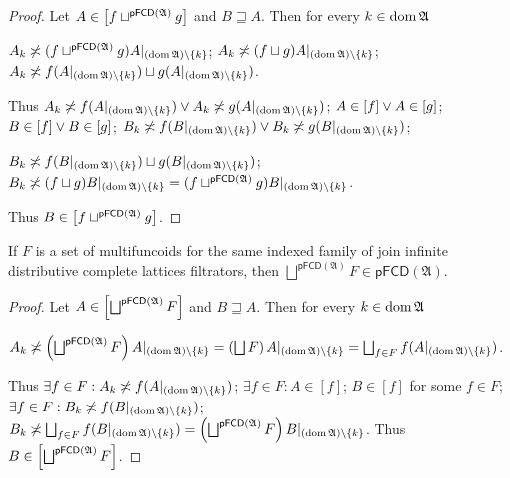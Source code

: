 \begin{proof}
Let $A\in\mathord{\mathrel{\left[f\sqcup^{\mathsf{pFCD}(\mathfrak{A})}g\right]}}$
and $B\sqsupseteq A$. Then for every $k\in\operatorname{dom}\mathfrak{A}$

$A_{k}\not\asymp(f\sqcup^{\mathsf{pFCD}(\mathfrak{A})}g)A|_{(\operatorname{dom}\mathfrak{A})\setminus\{k\}}$;
$A_{k}\not\asymp(f\sqcup g)A|_{(\operatorname{dom}\mathfrak{A})\setminus\{k\}}$; $A_{k}\not\asymp f(A|_{(\operatorname{dom}\mathfrak{A})\setminus\{k\}})\sqcup g(A|_{(\operatorname{dom}\mathfrak{A})\setminus\{k\}})$.

Thus $A_{k}\not\asymp f(A|_{(\operatorname{dom}\mathfrak{A})\setminus\{k\}})\lor A_{k}\not\asymp g(A|_{(\operatorname{dom}\mathfrak{A})\setminus\{k\}})$;
$A\in\mathord{\mathrel{\left[f\right]}}\lor A\in\mathord{\mathrel{\left[g\right]}}$; $B\in\mathord{\mathrel{\left[f\right]}}\lor B\in\mathord{\mathrel{\left[g\right]}}$;
$B_{k}\not\asymp f(B|_{(\operatorname{dom}\mathfrak{A})\setminus\{k\}})\lor B_{k}\not\asymp g(B|_{(\operatorname{dom}\mathfrak{A})\setminus\{k\}})$;

$B_{k}\not\asymp f(B|_{(\operatorname{dom}\mathfrak{A})\setminus\{k\}})\sqcup g(B|_{(\operatorname{dom}\mathfrak{A})\setminus\{k\}})$;
$B_{k}\not\asymp(f\sqcup g)B|_{(\operatorname{dom}\mathfrak{A})\setminus\{k\}}=(f\sqcup^{\mathsf{pFCD}(\mathfrak{A})}g)B|_{(\operatorname{dom}\mathfrak{A})\setminus\{k\}}$.

Thus $B\in\mathord{\mathrel{\left[f\sqcup^{\mathsf{pFCD}(\mathfrak{A})}g\right]}}$.\end{proof}
\begin{thm}
If $F$ is a set of multifuncoids for the same indexed family of join
infinite distributive complete lattices filtrators, then $\bigsqcup^{\mathsf{pFCD}(\mathfrak{A})}F\in\mathsf{pFCD}(\mathfrak{A})$.\end{thm}
\begin{proof}
Let $A\in\mathord{\mathrel{\left[\bigsqcup^{\mathsf{pFCD}(\mathfrak{A})}F\right]}}$
and $B\sqsupseteq A$. Then for every $k\in\operatorname{dom}\mathfrak{A}$

$A_{k}\not\asymp\left(\bigsqcup^{\mathsf{pFCD}(\mathfrak{A})}F\right)A|_{(\operatorname{dom}\mathfrak{A})\setminus\{k\}}=\left(\bigsqcup F\right)A|_{(\operatorname{dom}\mathfrak{A})\setminus\{k\}}=\bigsqcup_{f\in F}f(A|_{(\operatorname{dom}\mathfrak{A})\setminus\{k\}})$.

Thus $\exists f\in F:A_{k}\not\asymp f(A|_{(\operatorname{dom}\mathfrak{A})\setminus\{k\}})$;
$\exists f\in F:A\in\mathord{[f]}$; $B\in\mathord{[f]}$ for some
$f\in F$; $\exists f\in F:B_{k}\not\asymp f(B|_{(\operatorname{dom}\mathfrak{A})\setminus\{k\}})$;
$B_{k}\not\asymp\bigsqcup_{f\in F}f(B|_{(\operatorname{dom}\mathfrak{A})\setminus\{k\}})=\left(\bigsqcup^{\mathsf{pFCD}(\mathfrak{A})}F\right)B|_{(\operatorname{dom}\mathfrak{A})\setminus\{k\}}$.
Thus $B\in\mathord{\mathrel{\left[\bigsqcup^{\mathsf{pFCD}(\mathfrak{A})}F\right]}}$.
\end{proof}


